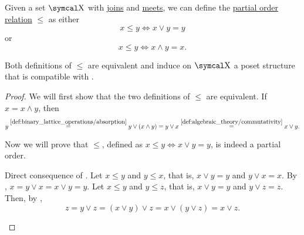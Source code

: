 \begin{Proposition}\label{thm:binary_lattice_operations_poset}
  Given a set \( \CX \) with \hyperref[def:binary_lattice_operations/join]{joins} and \hyperref[def:binary_lattice_operations/meet]{meets}, we can define the \hyperref[def:poset]{partial order relation} \( \leq \) as either
  \begin{equation*}
    x \leq y \iff x \vee y = y
  \end{equation*}
  or
  \begin{equation*}
    x \leq y \iff x \wedge y = x.
  \end{equation*}

  Both definitions of \( \leq \) are equivalent and induce on \( \CX \) a poset structure that is compatible with .
\end{Proposition}
\begin{proof}
  We will first show that the two definitions of \( \leq \) are equivalent. If \( x = x \wedge y \), then
  \begin{equation*}
    y
    \overset {\ref{def:binary_lattice_operations/absorption}} =
    y \vee (x \wedge y)
    =
    y \vee x
    \overset {\ref{def:algebraic_theory/commutativity}} =
    x \vee y.
  \end{equation*}

  Now we will prove that \( \leq \), defined as \( x \leq y \iff x \vee y = y \), is indeed a partial order.
  \begin{RefList}
     Direct consequence of .
     Let \( x \leq y \) and \( y \leq x \), that is, \( x \vee y = y \) and \( y \vee x = x \). By , \( x = y \vee x = x \vee y = y \).
     Let \( x \leq y \) and \( y \leq z \), that is, \( x \vee y = y \) and \( y \vee z = z \). Then, by ,
    \begin{equation*}
      z = y \vee z = (x \vee y) \vee z = x \vee (y \vee z) = x \vee z.
    \end{equation*}
  \end{RefList}
\end{proof}


